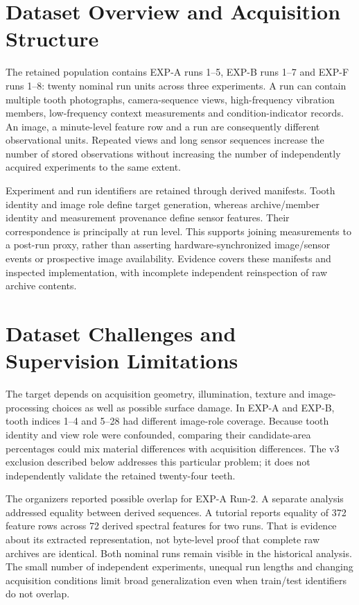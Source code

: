 \section{Dataset Overview and Acquisition Structure}
The retained population contains EXP-A runs 1--5, EXP-B runs 1--7 and EXP-F runs 1--8:
twenty nominal run units across three experiments. A run can contain multiple tooth
photographs, camera-sequence views, high-frequency vibration members, low-frequency
context measurements and condition-indicator records. An image, a minute-level feature
row and a run are consequently different observational units. Repeated views and long
sensor sequences increase the number of stored observations without increasing the
number of independently acquired experiments to the same extent.

Experiment and run identifiers are retained through derived manifests. Tooth identity
and image role define target generation, whereas archive/member identity and measurement
provenance define sensor features. Their correspondence is principally at run level.
This supports joining measurements to a post-run proxy, rather than asserting
hardware-synchronized image/sensor events or prospective image availability. Evidence
covers these manifests and inspected implementation, with incomplete independent
reinspection of raw archive contents.

\section{Dataset Challenges and Supervision Limitations}
The target depends on acquisition geometry, illumination, texture and image-processing
choices as well as possible surface damage. In EXP-A and EXP-B, tooth indices 1--4 and
5--28 had different image-role coverage. Because tooth identity and view role were
confounded, comparing their candidate-area percentages could mix material differences
with acquisition differences. The v3 exclusion described below addresses this particular
problem; it does not independently validate the retained twenty-four teeth.

The organizers reported possible overlap for EXP-A Run-2. A separate analysis addressed
equality between derived sequences. A tutorial reports equality of 372 feature rows
across 72 derived spectral features for two runs. That is evidence about its extracted
representation, not byte-level proof that complete raw archives are identical. Both
nominal runs remain visible in the historical analysis. The small number of independent
experiments, unequal run lengths and changing acquisition conditions limit broad
generalization even when train/test identifiers do not overlap.

